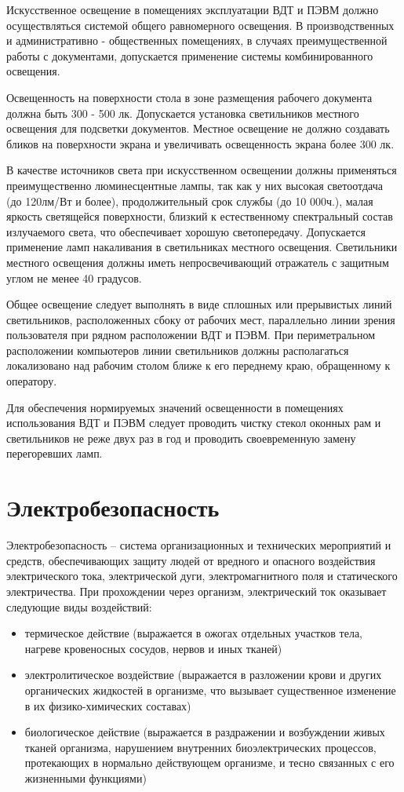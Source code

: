 \documentclass[12pt,a4paper]{report}
\begin{document}
Искусственное освещение в помещениях эксплуатации ВДТ и ПЭВМ должно осуществляться системой общего равномерного освещения. В производственных и административно - общественных помещениях, в случаях преимущественной работы с документами, допускается применение системы комбинированного освещения.

Освещенность на поверхности стола в зоне размещения рабочего документа должна быть 300 - 500 лк. Допускается установка светильников местного освещения для подсветки документов. Местное освещение не должно создавать бликов на поверхности экрана и увеличивать освещенность экрана более 300 лк. 

В качестве источников света при искусственном освещении должны применяться преимущественно люминесцентные лампы, так как у них высокая светоотдача (до 120лм/Вт и более), продолжительный срок службы (до 10 000ч.), малая яркость светящейся поверхности, близкий к естественному спектральный состав излучаемого света, что обеспечивает хорошую светопередачу. Допускается применение ламп накаливания в светильниках местного освещения. Светильники местного освещения должны иметь непросвечивающий отражатель с защитным углом не менее 40 градусов.

Общее освещение следует выполнять в виде сплошных или прерывистых линий светильников, расположенных сбоку от рабочих мест, параллельно линии зрения пользователя при рядном расположении ВДТ и ПЭВМ. При периметральном расположении компьютеров линии светильников должны располагаться локализовано над рабочим столом ближе к его переднему краю, обращенному к оператору. 

Для обеспечения нормируемых значений освещенности в помещениях использования ВДТ и ПЭВМ следует проводить чистку стекол оконных рам и светильников не реже двух раз в год и проводить своевременную замену перегоревших ламп.

\section{Электробезопасность}
Электробезопасность – система организационных и технических мероприятий и средств, обеспечивающих защиту людей от вредного и опасного воздействия электрического тока, электрической дуги, электромагнитного поля и статического электричества. При прохождении через организм, электрический ток оказывает следующие виды воздействий:
\begin{itemize}
\item термическое действие (выражается в ожогах отдельных участков тела, нагреве кровеносных сосудов, нервов и иных тканей)
\item электролитическое воздействие (выражается в разложении крови и других органических жидкостей в организме, что вызывает существенное изменение в их физико-химических составах)
\item биологическое действие (выражается в раздражении и возбуждении живых тканей организма, нарушением внутренних биоэлектрических процессов, протекающих в нормально действующем организме, и тесно связанных с его жизненными функциями)
\end{itemize}
\end{document}

